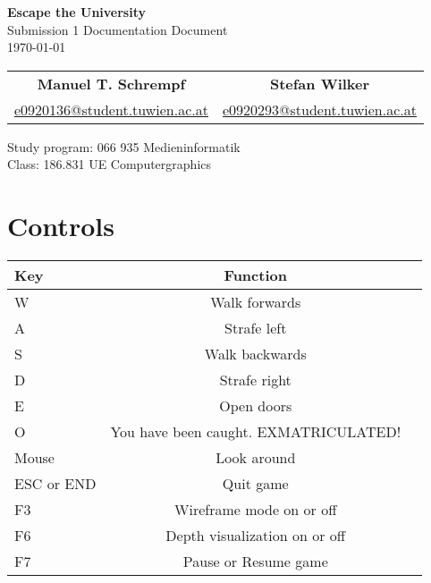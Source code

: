 \documentclass[12pt]{article}
\begin{document}
\begin{titlepage}
 \vspace*{8cm}
\begin{center}
 \textbf{\Huge Escape the University} \\
  \vspace{3mm}
 {\Large Submission 1 Documentation Document\\
  \vspace{3mm}
  \today}
 \vspace{5mm}
\begin{table}[h!]
  \centering
  \begin{tabular}{c c}
	\textbf{Manuel T. Schrempf}  &   \textbf{Stefan Wilker}\\
	\href{mailto:e0920136@student.tuwien.ac.at}{e0920136@student.tuwien.ac.at}&
	\href{mailto:e0920293@student.tuwien.ac.at}{e0920293@student.tuwien.ac.at}\\
  \end{tabular}
\end{table}

 \vspace{3mm}
{\large Study program: 066 935 Medieninformatik\\
 \vspace{2mm}
Class: 186.831 UE Computergraphics}
\end{center}
\end{titlepage}
\tableofcontents %
\newpage
\pagestyle{plain}
\setcounter{page}{1}

\section{Controls \label{Controls}}

\begin{table}[h!]
  \centering
  \label{table1}
  \begin{tabular}{p{3cm} c c}
Key & Function\\
    \hline
W & Walk forwards	\\
A & Strafe left \\
S & Walk backwards \\
D & Strafe right \\
E & Open doors\\
O & You have been caught. EXMATRICULATED! \\

Mouse & Look around\\

 ESC or END & Quit game \\
 F3 & Wireframe mode on or off \\
 F6 & Depth visualization on or off\\ %
 F7 & Pause or Resume game \\
  \end{tabular}
\end{table}
\end{document}
